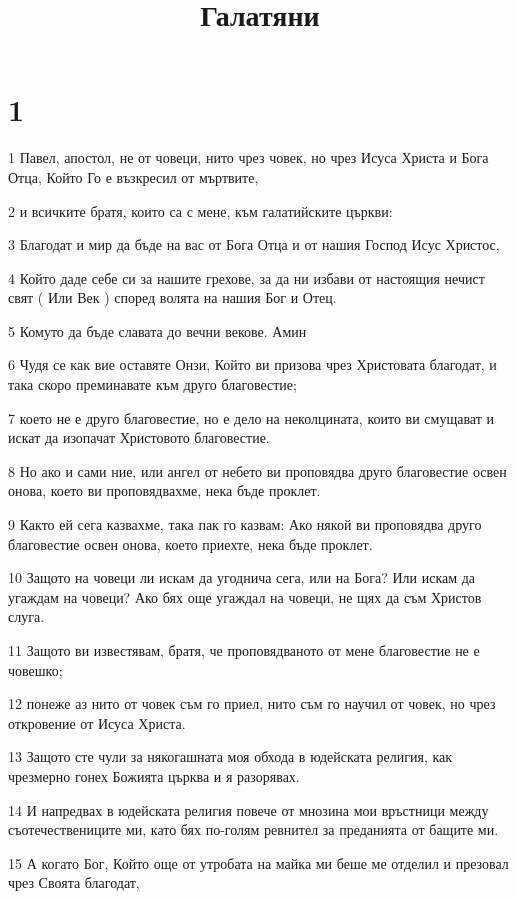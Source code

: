 

\title{Галатяни}


\chapter{1}

\par 1 Павел, апостол, не от човеци, нито чрез човек, но чрез Исуса Христа и Бога Отца, Който Го е възкресил от мъртвите,
\par 2 и всичките братя, които са с мене, към галатийските църкви:
\par 3 Благодат и мир да бъде на вас от Бога Отца и от нашия Господ Исус Христос,
\par 4 Който даде себе си за нашите грехове, за да ни избави от настоящия нечист свят ( Или Век ) според волята на нашия Бог и Отец.
\par 5 Комуто да бъде славата до вечни векове. Амин
\par 6 Чудя се как вие оставяте Онзи, Който ви призова чрез Христовата благодат, и така скоро преминавате към друго благовестие;
\par 7 което не е друго благовестие, но е дело на неколцината, които ви смущават и искат да изопачат Христовото благовестие.
\par 8 Но ако и сами ние, или ангел от небето ви проповядва друго благовестие освен онова, което ви проповядвахме, нека бъде проклет.
\par 9 Както ей сега казвахме, така пак го казвам: Ако някой ви проповядва друго благовестие освен онова, което приехте, нека бъде проклет.
\par 10 Защото на човеци ли искам да угоднича сега, или на Бога? Или искам да угаждам на човеци? Ако бях още угаждал на човеци, не щях да съм Христов слуга.
\par 11 Защото ви известявам, братя, че проповядваното от мене благовестие не е човешко;
\par 12 понеже аз нито от човек съм го приел, нито съм го научил от човек, но чрез откровение от Исуса Христа.
\par 13 Защото сте чули за някогашната моя обхода в юдейската религия, как чрезмерно гонех Божията църква и я разорявах.
\par 14 И напредвах в юдейската религия повече от мнозина мои връстници между съотечествениците ми, като бях по-голям ревнител за преданията от бащите ми.
\par 15 А когато Бог, Който още от утробата на майка ми беше ме отделил и презовал чрез Своята благодат,
